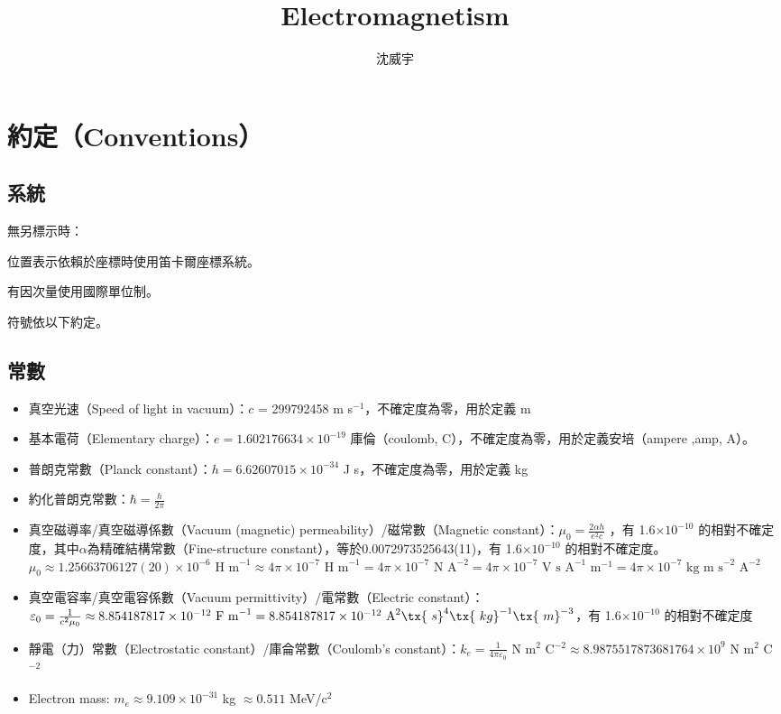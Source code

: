 \documentclass[a4paper,12pt]{report}
\begin{document}
\title{Electromagnetism}
\author{沈威宇}
\date{\temtoday}
\titletocdoc
{}


\section{約定（Conventions）}
\subsection{系統}
無另標示時：
\bit
\item 位置表示依賴於座標時使用笛卡爾座標系統。
\item 有因次量使用國際單位制。
\item 符號依以下約定。
\eit
\subsection{常數}
\begin{itemize}
\item 真空光速（Speed of light in vacuum）：$c$ = 299792458 m s$^{-1}$，不確定度為零，用於定義 m
\item 基本電荷（Elementary charge）：$e = 1.602176634 \times 10^{-19}$ 庫倫（coulomb, C），不確定度為零，用於定義安培（ampere ,amp, A）。
\item 普朗克常數（Planck constant）：$h = 6.62607015 \times 10^{-34}$ J s，不確定度為零，用於定義 kg
\item 約化普朗克常數：$\hbar=\frac{h}{2\pi}$
\item 真空磁導率/真空磁導係數（Vacuum (magnetic) permeability）/磁常數（Magnetic constant）：$\mu_0 = \frac{2\alpha h}{e^2c}$ ，有 1.6$\times 10^{-10}$ 的相對不確定度，其中$\alpha$為精確結構常數（Fine-structure constant），等於0.0072973525643(11)，有 1.6$\times 10^{-10}$ 的相對不確定度。$\mu_0\approx 1.25663706127(20)\times 10^{-6}\text{\ H m}^{-1}\approx 4\pi\times 10^{-7} \text{\ H m}^{-1} = 4\pi\times 10^{-7} \text{\ N A}^{-2} = 4\pi\times 10^{-7} \text{\ V s A}^{-1} \text{\ m}^{-1}  = 4\pi\times 10^{-7} \text{\ kg m s}^{-2} \text{\ A}^{-2}$ 
\item 真空電容率/真空電容係數（Vacuum permittivity）/電常數（Electric constant）：$\varepsilon_0 = \frac{1}{c^2\mu_0} \approx 8.854187817 \times 10^{-12} \text{\ F m}^{-1} = 8.854187817 \times 10^{-12} \text{\ A}^2\tx{\ s}^4\tx{\ kg}^{-1}\tx{\ m}^{-3}$，有 1.6$\times 10^{-10}$ 的相對不確定度
\item 靜電（力）常數（Electrostatic constant）/庫侖常數（Coulomb's constant）：$k_e = \frac{1}{4\pi\varepsilon_0}$ N m$^2$ C$^{-2} \approx 8.9875517873681764 \times 10^{9}$ N m$^2$ C$^{-2}$
\item Electron mass: $m_e\approx 9.109\times 10^{-31}$ kg $\approx 0.511$ MeV/c$^2$
\end{itemize}
\end{document}
